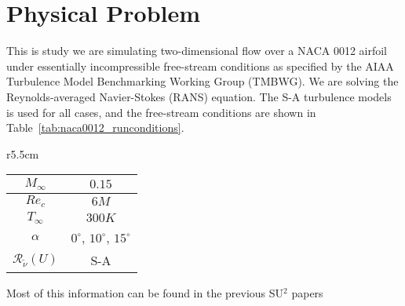 
\section{Physical Problem}

This is study we are simulating two-dimensional flow over a NACA 0012 airfoil under essentially incompressible free-stream conditions as specified by the AIAA Turbulence Model Benchmarking Working Group (TMBWG).  We are solving the Reynolds-averaged Navier-Stokes (RANS) equation. The S-A  turbulence models is used for all cases, and the free-stream conditions are shown in Table~\ref{tab:naca0012_runconditions}. 

\begin{wraptable}{r}{5.5cm}
  \begin{center}
  \begin{tabular}{||c|c||} \hline
    $M_\infty$ & $0.15$ \\ \hline 
    $Re_c$     & $6M$ \\ \hline
    $T_\infty$ & $300K$ \\ \hline
    $\alpha$ & $0^{\circ}$, $10^{\circ}$, $15^{\circ}$ \\ \hline
    $\mathcal{R}_{\tilde\nu}(U)$ & S-A \\ \hline
  \end{tabular}
  \caption{NACA 0012 free-stream conditions.} \label{tab:naca0012_runconditions}
  \end{center}
\end{wraptable} 





Most of this information can be found in the previous SU$^2$ papers \cite{Palacios:2014,PalaciosEconomon:2014}





